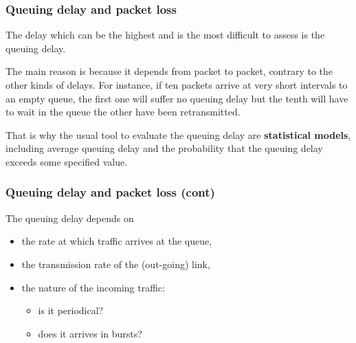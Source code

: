 %
\begin{frame}
\frametitle{Queuing delay and packet loss}

The delay which can be the highest and is the most difficult to assess
is the queuing delay. 

\bigskip

The main reason is because it depends from
packet to packet, contrary to the other kinds of delays. For instance,
if ten packets arrive at very short intervals to an empty queue, the
first one will suffer no queuing delay but the tenth will have to wait
in the queue the other have been retransmitted.

\bigskip

That is why the usual tool to evaluate the queuing delay are
\textbf{statistical models}, including average queuing delay and the
probability that the queuing delay exceeds some specified value.

\end{frame}

%
\begin{frame}
\frametitle{Queuing delay and packet loss (cont)}

The queuing delay depends on
\begin{itemize}

  \item the rate at which traffic arrives at the queue,

  \item the transmission rate of the (out-going) link,

  \item the nature of the incoming traffic:

  \begin{itemize}

    \item is it periodical?

    \item does it arrives in bursts?

  \end{itemize}

\end{itemize}

\end{frame}

